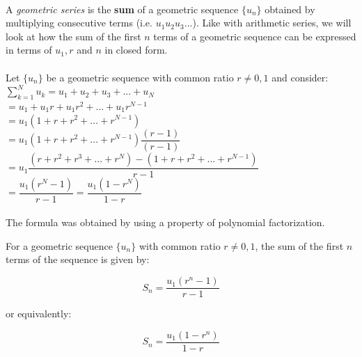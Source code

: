 \documentclass[12pt, a4paper, titlepage, twoside]{article}
\begin{document}
	\paragraph{}
	A \textit{geometric series} is the \textbf{sum} of a geometric sequence $\{u_n\}$ obtained by multiplying consecutive
	terms (i.e. $u_1 u_2 u_3 ...$). Like with arithmetic series, we will look at how the sum of the first $n$ terms of a geometric 
	sequence can be expressed in terms of $u_1, r$ and  $n$ in closed form.
	
	\paragraph{}
	Let $\{u_n\}$ be a geometric sequence with common ratio $r \neq 0,1$ and consider: \\
	
	$\displaystyle \sum_{k=1}^N u_k = u_1 + u_2 + u_3 + ... + u_N$\\
	
	$= u_1 + u_1 r + u_1 r^2 + ... + u_1 r^{N-1}$\\
	
	$= u_1 (1 + r + r^2 + ... + r^{N-1})$\\
	
	$= u_1 (1 + r + r^2 + ... + r^{N-1}) \dfrac{(r-1)}{(r-1)}$\\
	
	$=  u_1 \dfrac{(r + r^2 + r^3 + ... + r^N) - (1 + r + r^2 + ... + r^{N-1})}{r-1}$\\
	
	$=  \dfrac{u_1 (r^N - 1)}{r-1} = \dfrac{u_1 (1 - r^N)}{1-r}$
	
	\paragraph{}
	The formula was obtained by using a property of polynomial factorization.\\
	
	\begin{kp}
		For a geometric sequence $\{u_n\}$ with common ratio $r \neq 0,1$, the sum of the first $n$ terms of the sequence is given by:
		
		$$S_n = \dfrac{u_1 (r^n - 1)}{r-1}$$
		
		or equivalently:
		
		$$S_n = \dfrac{u_1 (1 - r^n)}{1-r}$$
	\end{kp}
	
	\hfill
	
\end{document}
